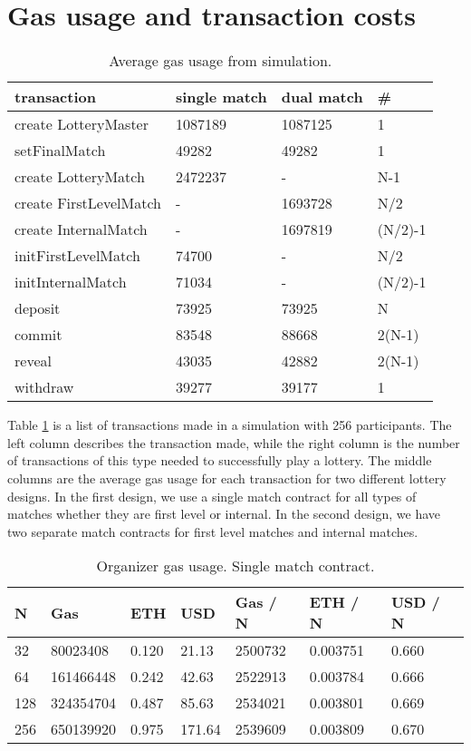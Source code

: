 \section{Gas usage and transaction costs}
\label{sec:gas}

\begin{table}[h]
\centering
\caption{Average gas usage from simulation.}
\label{tab:gas-usage}
\begin{tabular}{|l|l|l|l|}
\hline

transaction & single match & dual match & \# \\ \hline
create LotteryMaster & 1087189 & 1087125 & 1 \\ \hline
setFinalMatch & 49282 & 49282 & 1 \\ \hline
create LotteryMatch & 2472237 & - & N-1 \\ \hline
create FirstLevelMatch & - & 1693728 & N/2 \\ \hline
create InternalMatch & - & 1697819 & (N/2)-1 \\ \hline
initFirstLevelMatch & 74700 & - & N/2 \\ \hline
initInternalMatch & 71034 & - & (N/2)-1 \\ \hline
deposit & 73925 & 73925 & N \\ \hline
commit & 83548 & 88668 & 2(N-1) \\ \hline
reveal & 43035 & 42882 & 2(N-1) \\ \hline
withdraw & 39277 & 39177 & 1 \\ \hline

\end{tabular}
\end{table}

\noindent
Table \ref{tab:gas-usage} is a list of transactions made in a simulation with 256 participants. The left column describes the transaction made, while the right column is the number of transactions of this type needed to successfully play a lottery. The middle columns are the average gas usage for each transaction for two different lottery designs. In the first design, we use a single match contract for all types of matches whether they are first level or internal. In the second design, we have two separate match contracts for first level matches and internal matches. 

\begin{table}[h]
\centering
\caption{Organizer gas usage. Single match contract.}
\label{tab:org-gas-usage-single}
\begin{tabular}{|l|l|l|l|l|l|l|}
\hline

N & Gas & ETH & USD & Gas / N & ETH / N & USD / N \\ \hline
32 & 80023408 & 0.120 & 21.13 & 2500732 & 0.003751 & 0.660 \\ \hline
64 & 161466448 & 0.242 & 42.63 & 2522913 & 0.003784 & 0.666 \\ \hline
128 & 324354704 & 0.487 & 85.63 & 2534021 & 0.003801 & 0.669 \\ \hline
256 & 650139920 & 0.975 & 171.64 & 2539609 & 0.003809 & 0.670 \\ \hline

\end{tabular}
\end{table}

